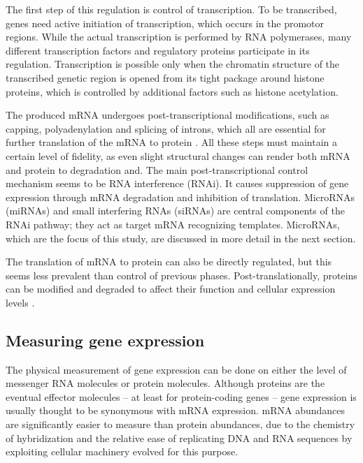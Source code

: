 The first step of this regulation is control of transcription. To be
transcribed, genes need active initiation of transcription, which
occurs in the promotor regions. While the actual transcription is performed by
RNA polymerases, many different transcription factors and regulatory proteins
participate in its regulation. Transcription is possible only when
the chromatin structure of the transcribed genetic region is opened from its
tight package around histone proteins, which is controlled by additional
factors such as histone acetylation.

The produced mRNA undergoes post-transcriptional modifications, such as
capping, polyadenylation and splicing of introns, which all are essential for
further translation of the mRNA to protein \citep{Strachan2011}. All these
steps must maintain a certain level of fidelity, as even slight structural
changes can render both mRNA and protein to degradation and. The main
post-transcriptional control mechanism seems to be RNA interference (RNAi). It
causes suppression of gene expression through mRNA degradation and inhibition of translation.
MicroRNAs (miRNAs) and small interfering RNAs (siRNAs) are central components of the
RNAi pathway; they act as target mRNA recognizing templates. \cite{Du2005}
MicroRNAs, which are the focus of this study, are discussed in more detail in the next section.

The translation of mRNA to protein can also be directly regulated, but this
seems less prevalent than control of previous phases. Post-translationally,
proteins can be modified and degraded to affect their function and cellular
expression levels \citep{Strachan2011}.




\subsection{Measuring gene expression}\label{measurement-of-gene-expression}

The physical measurement of gene expression can be done on either the level of
messenger RNA molecules or protein molecules. Although proteins are the
eventual effector molecules -- at least for protein-coding genes
-- gene expression is usually thought to be synonymous with mRNA expression.
mRNA abundances are significantly easier to measure
than protein abundances, due to the chemistry of hybridization and
the relative ease of replicating DNA and RNA sequences by exploiting cellular
machinery evolved for this purpose.

